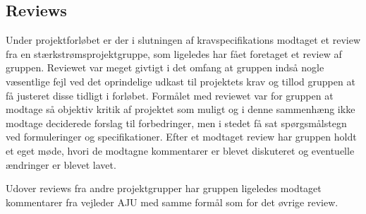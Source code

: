 \subsection{Reviews}
Under projektforløbet er der i slutningen af kravspecifikations modtaget et review\cite{lib:Review1} fra en stærkstrømsprojektgruppe, som ligeledes har fået foretaget et review af gruppen.
Reviewet var meget givtigt i det omfang at gruppen indså nogle væsentlige fejl ved det oprindelige udkast til projektets krav og tillod gruppen at få justeret disse tidligt i forløbet.
Formålet med reviewet var for gruppen at modtage så objektiv kritik af projektet som muligt og i denne sammenhæng ikke modtage deciderede forslag til forbedringer, men i stedet få sat spørgsmålstegn ved formuleringer og specifikationer.
Efter et modtaget review har gruppen holdt et eget møde, hvori de modtagne kommentarer er blevet diskuteret og eventuelle ændringer er blevet lavet.

Udover reviews fra andre projektgrupper har gruppen ligeledes modtaget kommentarer fra vejleder AJU med samme formål som for det øvrige review.

\clearpage